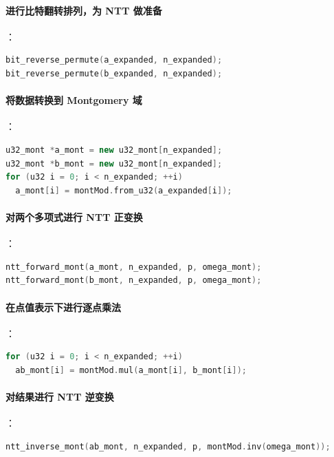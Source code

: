\documentclass[a4paper]{article}
\begin{document}
\paragraph{进行比特翻转排列，为 NTT 做准备}

：

\begin{lstlisting}[language=C++]
bit_reverse_permute(a_expanded, n_expanded);
bit_reverse_permute(b_expanded, n_expanded);
\end{lstlisting}

\paragraph{将数据转换到 Montgomery 域}

：

\begin{lstlisting}[language=C++]
u32_mont *a_mont = new u32_mont[n_expanded];
u32_mont *b_mont = new u32_mont[n_expanded];
for (u32 i = 0; i < n_expanded; ++i)
  a_mont[i] = montMod.from_u32(a_expanded[i]);
\end{lstlisting}

\paragraph{对两个多项式进行 NTT 正变换}

：

\begin{lstlisting}[language=C++]
ntt_forward_mont(a_mont, n_expanded, p, omega_mont);
ntt_forward_mont(b_mont, n_expanded, p, omega_mont);
\end{lstlisting}

\paragraph{在点值表示下进行逐点乘法}

：

\begin{lstlisting}[language=C++]
for (u32 i = 0; i < n_expanded; ++i)
  ab_mont[i] = montMod.mul(a_mont[i], b_mont[i]);
\end{lstlisting}

\paragraph{对结果进行 NTT 逆变换}

：

\begin{lstlisting}[language=C++]
ntt_inverse_mont(ab_mont, n_expanded, p, montMod.inv(omega_mont));
\end{lstlisting}
\end{document}
